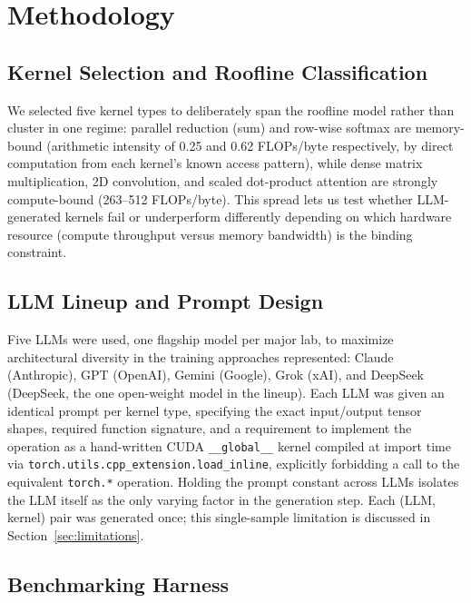 \documentclass[conference]{IEEEtran}
\begin{document}
\section{Methodology}

\subsection{Kernel Selection and Roofline Classification}

We selected five kernel types to deliberately span the roofline model rather than cluster in one
regime: parallel reduction (sum) and row-wise softmax are memory-bound (arithmetic intensity of
0.25 and 0.62 FLOPs/byte respectively, by direct computation from each kernel's known access
pattern), while dense matrix multiplication, 2D convolution, and scaled dot-product attention are
strongly compute-bound (263--512 FLOPs/byte). This spread lets us test whether LLM-generated
kernels fail or underperform differently depending on which hardware resource (compute throughput
versus memory bandwidth) is the binding constraint.

\subsection{LLM Lineup and Prompt Design}

Five LLMs were used, one flagship model per major lab, to maximize architectural diversity in the
training approaches represented: Claude (Anthropic), GPT (OpenAI), Gemini (Google), Grok (xAI),
and DeepSeek (DeepSeek, the one open-weight model in the lineup). Each LLM was given an identical
prompt per kernel type, specifying the exact input/output tensor shapes, required function
signature, and a requirement to implement the operation as a hand-written CUDA
\texttt{\_\_global\_\_} kernel compiled at import time via
\texttt{torch.utils.cpp\_extension.load\_inline}, explicitly forbidding a call to the equivalent
\texttt{torch.*} operation. Holding the prompt constant across LLMs isolates the LLM itself as the
only varying factor in the generation step. Each (LLM, kernel) pair was generated once; this
single-sample limitation is discussed in Section~\ref{sec:limitations}.

\subsection{Benchmarking Harness}
\end{document}
